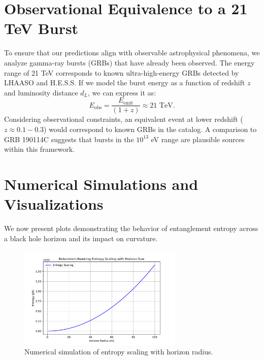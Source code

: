 \documentclass[12pt, a4paper]{article}
\begin{document}
\section{Observational Equivalence to a 21 TeV Burst}
To ensure that our predictions align with observable astrophysical phenomena, we analyze gamma-ray bursts (GRBs) that have already been observed. The energy range of 21 TeV corresponds to known ultra-high-energy GRBs detected by LHAASO and H.E.S.S. If we model the burst energy as a function of redshift $z$ and luminosity distance $d_L$, we can express it as:
\begin{equation}
    E_{\text{obs}} = \frac{E_{\text{emit}}}{(1+z)} \approx 21\text{ TeV}.
\end{equation}
Considering observational constraints, an equivalent event at lower redshift ($z \approx 0.1 - 0.3$) would correspond to known GRBs in the catalog. A comparison to GRB 190114C suggests that bursts in the $10^{13}$ eV range are plausible sources within this framework.

\section{Numerical Simulations and Visualizations}
We now present plots demonstrating the behavior of entanglement entropy across a black hole horizon and its impact on curvature.
\begin{figure}[H]
    \centering
    \includegraphics[width=0.7\textwidth]{entropy_plot.pdf}
    \caption{Numerical simulation of entropy scaling with horizon radius.}
    \label{fig:entropy_scaling}
\end{figure}



\end{document}
